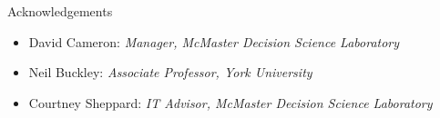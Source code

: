 \documentclass[22pt]{beamer}
\begin{document}
\begin{frame}[fragile]
\begin{textblock}{7.25}
\begin{block}{Acknowledgements}\newline
\begin{itemize}
\item David Cameron: \textit{Manager, McMaster Decision Science Laboratory}
\item Neil Buckley: \textit{Associate Professor, York University}
\item Courtney Sheppard: \textit{IT Advisor, McMaster Decision Science Laboratory}
\end{itemize}
\end{block}

% 

\begin{comment}
\begin{block}{References}
\setbeamertemplate{bibliography item}{\insertbiblabel}

{\scriptsize
}
\end{block}
\vspace{-1.8mm}
\end{comment}
\end{textblock}


\end{frame}
\end{document}

